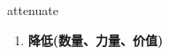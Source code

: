 
\begin{frame}
{\huge attenuate}
\begin{center}
\begin{enumerate}\Large
  \item \textbf{降低(数量、力量、价值)}
\end{enumerate}
\end{center}
\end{frame}
